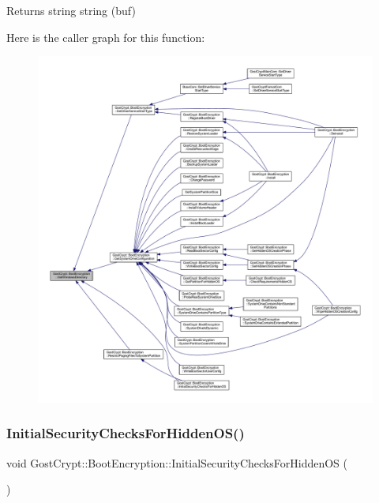 \begin{DoxyReturn}{Returns}
string string (buf) 
\end{DoxyReturn}
Here is the caller graph for this function\+:
\nopagebreak
\begin{figure}[H]
\begin{center}
\leavevmode
\includegraphics[width=350pt]{class_gost_crypt_1_1_boot_encryption_a2faa08fabf7bd37b8ebd9e0b6b437274_icgraph}
\end{center}
\end{figure}
\mbox{\label{class_gost_crypt_1_1_boot_encryption_af434150f29efc685046c3f92502eeb65}} 
\subsubsection{\texorpdfstring{Initial\+Security\+Checks\+For\+Hidden\+O\+S()}{InitialSecurityChecksForHiddenOS()}}
{\footnotesize\ttfamily void Gost\+Crypt\+::\+Boot\+Encryption\+::\+Initial\+Security\+Checks\+For\+Hidden\+OS (\begin{DoxyParamCaption}{ }\end{DoxyParamCaption})}



